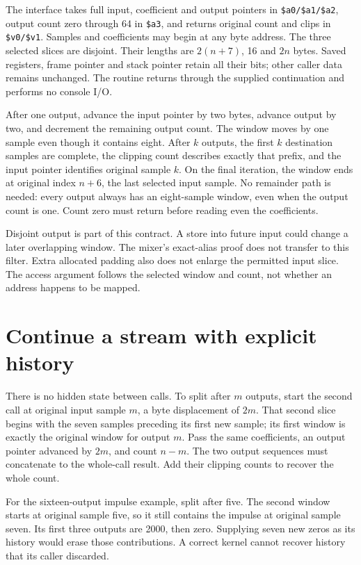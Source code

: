 The interface takes full input, coefficient and output pointers in
\texttt{\$a0/\$a1/\$a2}, output count zero through 64 in \texttt{\$a3}, and
returns original count and clips in \texttt{\$v0/\$v1}. Samples and coefficients
may begin at any byte address. The three selected slices are disjoint. Their
lengths are $2(n+7)$, 16 and $2n$ bytes. Saved registers, frame pointer and stack
pointer retain all their bits; other caller data remains unchanged. The routine
returns through the supplied continuation and performs no console I/O.

After one output, advance the input pointer by two bytes, advance output by two,
and decrement the remaining output count. The window moves by one sample even
though it contains eight. After $k$ outputs, the first $k$ destination samples
are complete, the clipping count describes exactly that prefix, and the input
pointer identifies original sample $k$. On the final iteration, the window ends
at original index $n+6$, the last selected input sample. No remainder path is
needed: every output always has an eight-sample window, even when the output
count is one. Count zero must return before reading even the coefficients.

Disjoint output is part of this contract. A store into future input could change
a later overlapping window. The mixer's exact-alias proof does not transfer to
this filter. Extra allocated padding also does not enlarge the permitted input
slice. The access argument follows the selected window and count, not whether an
address happens to be mapped.

\section{Continue a stream with explicit history}

There is no hidden state between calls. To split after $m$ outputs, start the
second call at original input sample $m$, a byte displacement of $2m$. That
second slice begins with the seven samples preceding its first new sample;
its first window is exactly the original window for output $m$. Pass the same
coefficients, an output pointer advanced by $2m$, and count $n-m$. The two output
sequences must concatenate to the whole-call result. Add their clipping counts
to recover the whole count.

For the sixteen-output impulse example, split after five. The second window
starts at original sample five, so it still contains the impulse at original
sample seven. Its first three outputs are 2000, then zero. Supplying seven new
zeros as its history would erase those contributions. A correct kernel cannot
recover history that its caller discarded.

